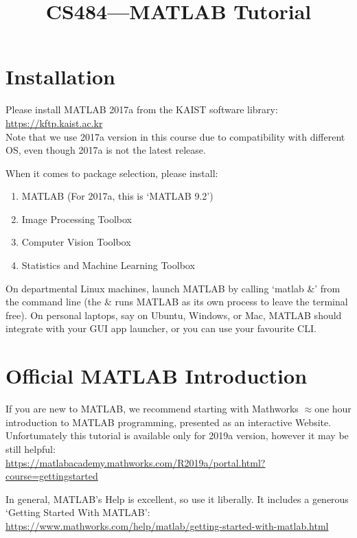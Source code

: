 \documentclass{article}
\date{}
\title{CS484---MATLAB Tutorial}
\begin{document}
\maketitle
\vspace{-2cm}
\thispagestyle{fancy}

\section{Installation}

Please install MATLAB 2017a from the KAIST software library: \href{https://kftp.kaist.ac.kr}{https://kftp.kaist.ac.kr}\\
Note that we use 2017a version in this course due to compatibility with different OS, even though 2017a is not the latest release.

When it comes to package selection, please install:
\begin{enumerate}
    \item MATLAB (For 2017a, this is `MATLAB 9.2')
    \item Image Processing Toolbox
    \item Computer Vision Toolbox
    \item Statistics and Machine Learning Toolbox
\end{enumerate}

On departmental Linux machines, launch MATLAB by calling `matlab \&' from the command line (the \& runs MATLAB as its own process to leave the terminal free). On personal laptops, say on Ubuntu, Windows, or Mac, MATLAB should integrate with your GUI app launcher, or you can use your favourite CLI.

\section{Official MATLAB Introduction}

If you are new to MATLAB, we recommend starting with Mathworks $\approx$one hour introduction to MATLAB programming, presented as an interactive Website. Unfortumately this tutorial is available only for 2019a version, however it may be still helpful:\\
\href{https://matlabacademy.mathworks.com/R2019a/portal.html?course=gettingstarted}{https://matlabacademy.mathworks.com/R2019a/portal.html?course=gettingstarted}

In general, MATLAB's Help is excellent, so use it liberally. It includes a generous `Getting Started With MATLAB':\\
\href{https://www.mathworks.com/help/matlab/getting-started-with-matlab.html}{https://www.mathworks.com/help/matlab/getting-started-with-matlab.html}
\end{document}
